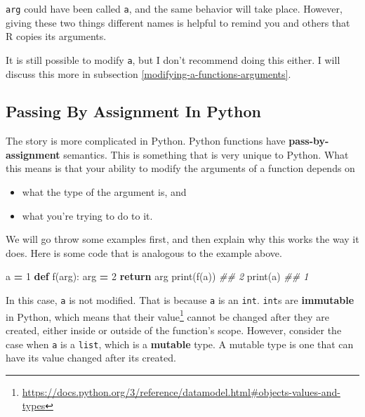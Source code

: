 \documentclass[12pt,krantz2]{krantz}
\makeatletter
\newenvironment{Shaded}{\begin{snugshade}}{\end{snugshade}}
\newcommand{\BuiltInTok}[1]{#1}
\newcommand{\CommentTok}[1]{\textcolor[rgb]{0.37,0.37,0.37}{\textit{#1}}}
\newcommand{\ControlFlowTok}[1]{\textcolor[rgb]{0.27,0.27,0.27}{\textbf{#1}}}
\newcommand{\DecValTok}[1]{\textcolor[rgb]{0.06,0.06,0.06}{#1}}
\newcommand{\KeywordTok}[1]{\textcolor[rgb]{0.27,0.27,0.27}{\textbf{#1}}}
\newcommand{\NormalTok}[1]{#1}
\newcommand{\OperatorTok}[1]{\textcolor[rgb]{0.43,0.43,0.43}{\textbf{#1}}}
\providecommand{\tightlist}{%
  \setlength{\itemsep}{0pt}\setlength{\parskip}{0pt}}
\renewcommand{\href}[2]{#2\footnote{\url{#1}}}
\newenvironment{kframe}{%
\medskip{}
\setlength{\fboxsep}{.8em}
 \def\at@end@of@kframe{}%
 \ifinner\ifhmode%
  \def\at@end@of@kframe{\end{minipage}}%
  \begin{minipage}{\columnwidth}%
 \fi\fi%
 \def\FrameCommand##1{\hskip\@totalleftmargin \hskip-\fboxsep
 \colorbox{shadecolor}{##1}\hskip-\fboxsep
     \hskip-\linewidth \hskip-\@totalleftmargin \hskip\columnwidth}%
 \MakeFramed {\advance\hsize-\width
   \@totalleftmargin\z@ \linewidth\hsize
   \@setminipage}}%
 {\par\unskip\endMakeFramed%
 \at@end@of@kframe}
\renewenvironment{Shaded}{\begin{kframe}}{\end{kframe}}
\makeatother
\begin{document}
\texttt{arg} could have been called \texttt{a}, and the same behavior will take place. However, giving these two things different names is helpful to remind you and others that R copies its arguments.

It is still possible to modify \texttt{a}, but I don't recommend doing this either. I will discuss this more in subsection \ref{modifying-a-functions-arguments}.

\hypertarget{passing-by-assignment-in-python}{%
\subsection{Passing By Assignment In Python}\label{passing-by-assignment-in-python}}

The story is more complicated in Python. Python functions have \textbf{pass-by-assignment} semantics. This is something that is very unique to Python. What this means is that your ability to modify the arguments of a function depends on

\begin{itemize}
\tightlist
\item
  what the type of the argument is, and
\item
  what you're trying to do to it.
\end{itemize}

We will go throw some examples first, and then explain why this works the way it does. Here is some code that is analogous to the example above.

\begin{Shaded}
\begin{Highlighting}[]
\NormalTok{a }\OperatorTok{=} \DecValTok{1}
\KeywordTok{def}\NormalTok{ f(arg):}
\NormalTok{    arg }\OperatorTok{=} \DecValTok{2}
    \ControlFlowTok{return}\NormalTok{ arg}
\BuiltInTok{print}\NormalTok{(f(a))}
\CommentTok{## 2}
\BuiltInTok{print}\NormalTok{(a)}
\CommentTok{## 1}
\end{Highlighting}
\end{Shaded}

In this case, \texttt{a} is not modified. That is because \texttt{a} is an \texttt{int}. \texttt{int}s are \textbf{immutable} in Python, which means that their \href{https://docs.python.org/3/reference/datamodel.html\#objects-values-and-types}{value} cannot be changed after they are created, either inside or outside of the function's scope. However, consider the case when \texttt{a} is a \texttt{list}, which is a \textbf{mutable} type. A mutable type is one that can have its value changed after its created.
\end{document}
